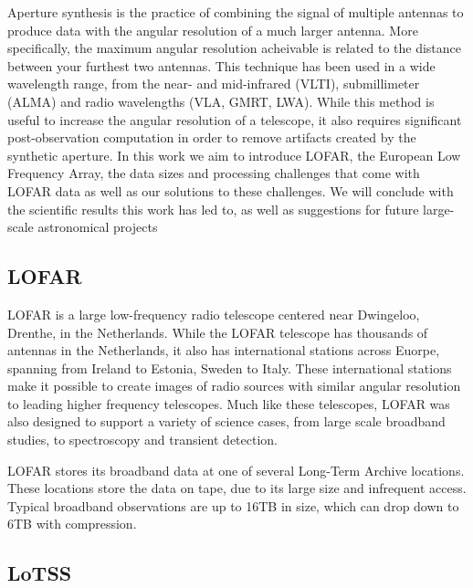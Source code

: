 Aperture synthesis is the practice of combining the signal of multiple antennas to produce data with the angular resolution of a much larger antenna. More specifically, the maximum angular resolution acheivable is related to the distance between your furthest two antennas. This technique has been used in a wide wavelength range, from the near- and mid-infrared (VLTI), submillimeter (ALMA) and radio wavelengths (VLA, GMRT, LWA). While this method is useful to increase the angular resolution of a telescope, it also requires significant post-observation computation in order to remove artifacts created by the synthetic aperture. In this work we aim to introduce LOFAR, the European Low Frequency Array, the data sizes and processing challenges that come with LOFAR data as well as our solutions to these challenges. We will conclude with the scientific results this work has led to, as well as suggestions for future large-scale astronomical projects

\subsection{LOFAR}

LOFAR is a large low-frequency radio telescope centered near Dwingeloo, Drenthe, in the Netherlands. While the LOFAR telescope has thousands of antennas in the Netherlands, it also has international stations across Euorpe, spanning from Ireland to Estonia, Sweden to Italy. These international stations make it possible to create images of radio sources with similar angular resolution to leading higher frequency telescopes. Much like these telescopes, LOFAR was also designed to support a variety of science cases, from large scale broadband studies, to spectroscopy and transient detection. 

LOFAR stores its broadband data at one of several Long-Term Archive locations. These locations store the data on tape, due to its large size and infrequent access. Typical broadband observations are up to 16TB in size, which can drop down to 6TB with compression. 

\subsection{LoTSS}  
